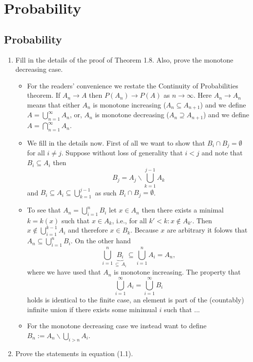\documentclass{article}
\begin{document}
\tableofcontents

\newpage

\section{Probability}
\subsection{Probability}
\begin{enumerate}
	\item Fill in the details of the proof of Theorem 1.8. Also, prove the monotone decreasing case.
		\begin{itemize}
			\item For the readers' convenience we restate the Continuity of Probabilities theorem. If $A_n \rightarrow A$ then $P(A_n) \rightarrow P(A)$ as $n \rightarrow \infty$. Here $A_n \rightarrow A_n$ means that either $A_n$ is monotone increasing ($A_n \subseteq A_{n + 1}$) and we define $A = \bigcup_{n = 1}^\infty A_n$, or, $A_n$ is monotone decreasing ($A_n \supseteq A_{n + 1}$) and we define $A = \bigcap_{n = 1}^\infty A_n$.
			\item We fill in the details now. First of all we want to show that $B_i \cap B_j = \emptyset$ for all $i \neq j$. Suppose without loss of generality that $i < j$ and note that $B_i \subseteq A_i$ then
			$$
			B_j = A_j \backslash \bigcup_{k = 1}^{j - 1} A_k
			$$
			and $B_i \subseteq A_i \subseteq \bigcup_{k = 1}^{j - 1}$ as such $B_i \cap B_j = \emptyset$.
			\item To see that $A_n = \bigcup_{i = 1}^n B_i$ let $x \in A_n$ then there exists a minimal $k = k(x)$ such that $x \in A_k$, i.e., for all $k' < k : x \notin A_{k'}$. Then $x \notin \bigcup_{i = 1}^{k - 1} A_i$ and therefore $x \in B_k$. Because $x$ are arbitrary it folows that $A_n \subseteq \bigcup_{i = 1}^n B_i$. On the other hand
			$$
			\bigcup_{i = 1}^n \underbrace{B_i}_{\subseteq\ A_i} \subseteq \bigcup_{i = 1}^n A_i = A_n,
			$$
			where we have used that $A_n$ is monotone increasing. The property that
			$$
			\bigcup_{i = 1}^\infty A_i = \bigcup_{i = 1}^\infty B_i
			$$
			holds is identical to the finite case, an element is part of the (countably) infinite union if there exists some minimual $i$ such that ...
			\item For the monotone decreasing case we instead want to define $B_n := A_n \backslash \bigcup_{i > n} A_i$.
		\end{itemize}
	\item Prove the statements in equation (1.1).

\end{enumerate}
\end{document}
